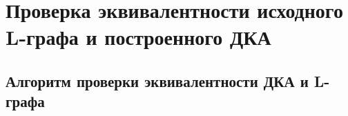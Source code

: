 \chapter{Проверка эквивалентности исходного L-графа и построенного ДКА} %
\label{chapt_eq_check}

\section{Алгоритм проверки эквивалентности ДКА и L-графа} %
\label{sect_eq_check_alg}


